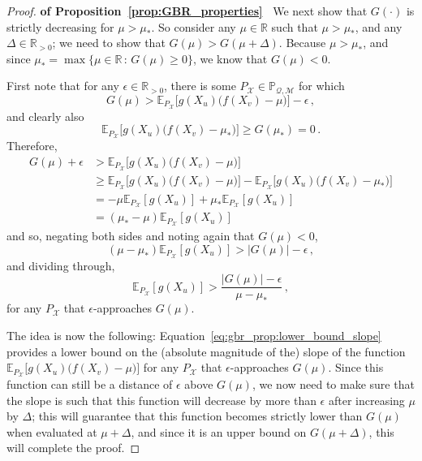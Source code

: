 \documentclass[twoside,11pt]{article}
\newcommand{\reals}{\mathbb{R}}
\newcommand{\realspos}{\reals_{>0}}
\newcommand{\states}{\mathcal{X}}
\newcommand{\rateset}{\mathcal{Q}}
\newcommand{\abs}[1]{\left\vert #1 \right\vert}
\begin{document}
\begin{proof}{\bf of Proposition~\ref{prop:GBR_properties}~}
We next show that $G(\cdot)$ is strictly decreasing for $\mu>\mu_*$. So consider any $\mu\in\reals$ such that $\mu>\mu_*$, and any $\Delta\in\realspos$; we need to show that $G(\mu)>G(\mu+\Delta)$. Because $\mu>\mu_*$, and since $\mu_*=\max\{\mu\in\reals\,:\,G(\mu)\geq 0\}$, we know that $G(\mu)<0$.

First note that for any $\epsilon\in\realspos$, there is some $P_{\states}\in\mathbb{P}_{\rateset,\mathcal{M}}$ for which
\begin{equation*}
G(\mu) > \mathbb{E}_{P_\states}\bigl[g(X_u)\bigl(f(X_v)-\mu\bigr)\bigr] - \epsilon\,,
\end{equation*}
and clearly also
\begin{equation*}
\mathbb{E}_{P_\states}\bigl[g(X_u)\bigl(f(X_v)-\mu_*\bigr)\bigr] \geq G(\mu_*) = 0\,.
\end{equation*}
Therefore,
\begin{align*}
G(\mu)+\epsilon &> \mathbb{E}_{P_\states}\bigl[g(X_u)\bigl(f(X_v)-\mu\bigr)\bigr] \\
 &\geq \mathbb{E}_{P_\states}\bigl[g(X_u)\bigl(f(X_v)-\mu\bigr)\bigr] - \mathbb{E}_{P_\states}\bigl[g(X_u)\bigl(f(X_v)-\mu_*\bigr)\bigr] \\
 &= -\mu\mathbb{E}_{P_\states}[g(X_u)] + \mu_*\mathbb{E}_{P_\states}[g(X_u)] \\
 &= (\mu_*-\mu)\mathbb{E}_{P_\states}[g(X_u)]
\end{align*}
and so, negating both sides and noting again that $G(\mu)<0$,
\begin{equation*}
(\mu-\mu_*)\mathbb{E}_{P_\states}[g(X_u)] > \abs{G(\mu)}-\epsilon\,,
\end{equation*}
and dividing through,
\begin{equation}\label{eq:gbr_prop:lower_bound_slope}
\mathbb{E}_{P_\states}[g(X_u)] > \frac{\abs{G(\mu)}-\epsilon}{\mu-\mu_*}\,,
\end{equation}
for any $P_\states$ that $\epsilon$-approaches $G(\mu)$. 

The idea is now the following: Equation~\eqref{eq:gbr_prop:lower_bound_slope} provides a lower bound on the (absolute magnitude of the) slope of the function $\mathbb{E}_{P_\states}\bigl[g(X_u)\bigl(f(X_v)-\mu\bigr)\bigr]$ for any $P_\states$ that $\epsilon$-approaches $G(\mu)$. Since this function can still be a distance of $\epsilon$ above $G(\mu)$, we now need to make sure that the slope is such that this function will decrease by more than $\epsilon$ after increasing $\mu$ by $\Delta$; this will guarantee that this function becomes strictly lower than $G(\mu)$ when evaluated at $\mu+\Delta$, and since it is an upper bound on $G(\mu+\Delta)$, this will complete the proof.


\end{proof}
\end{document}
